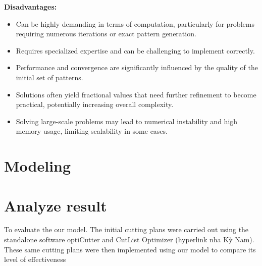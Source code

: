 \documentclass[a4paper]{article}
\begin{document}
\vspace{0.35cm}

\noindent\textbf{Disadvantages:}
\begin{itemize}
    \item Can be highly demanding in terms of computation, particularly for problems requiring numerous iterations or exact pattern generation.
    \item Requires specialized expertise and can be challenging to implement correctly.
    \item Performance and convergence are significantly influenced by the quality of the initial set of patterns.
    \item Solutions often yield fractional values that need further refinement to become practical, potentially increasing overall complexity.
    \item Solving large-scale problems may lead to numerical instability and high memory usage, limiting scalability in some cases.
\end{itemize}



\section{Modeling}
\section{Analyze result}
To evaluate the our model. The initial cutting plans were carried out using the standalone software optiCutter and CutList Optimizer (hyperlink nha Kỳ Nam). These same cutting plans were then implemented using our model to compare its level of effectiveness
\end{document}
